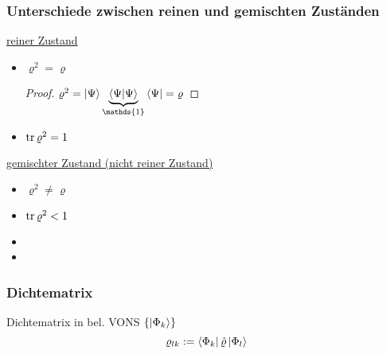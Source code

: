 \newpage
 \subsubsection*{Unterschiede zwischen reinen und gemischten Zuständen}
\begin{multicols}{2}
 \underline{reiner Zustand}
 \begin{itemize}
     \item $\varrho ^2 = \varrho$
     \begin{proof}
         $\varrho ^2 = \ket{\Psi} \underbrace{\braket{\Psi}}_{\mathds{1}} \bra{\Psi} = \varrho$
     \end{proof}
     \item $\trace \varrho^2 =1$
 \end{itemize}
 \columnbreak
 \underline{gemischter Zustand (nicht reiner Zustand)}
 \begin{itemize}
     \item $\varrho ^2 \neq \varrho$
     \item $\trace\varrho^2 < 1$
     \item[] 
     \item[]
 \end{itemize}
\end{multicols}
\subsubsection{Dichtematrix}

\begin{definition}{Dichtematrix in bel. VONS $\{ \ket{\Phi_k}\}$}
    \begin{equation}
        \varrho_{lk} := \bra{\Phi_k} \hat{\varrho} \ket{\Phi_l}
    \end{equation}
    
\end{definition}

